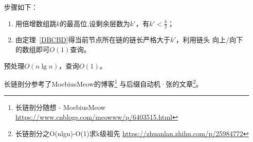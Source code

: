 步骤如下：
\begin{enumerate}
    \item 用倍增数组跳$k$的最高位,设剩余层数为$k'$，有$k'<\frac{k}{2}$；
    \item 由定理~\ref{DBCBD}得当前节点所在链的链长严格大于$k'$，利用链头
    向上/向下的数组即可$O(1)$查询。
\end{enumerate}

预处理$O(n\lg n)$，查询$O(1)$。

长链剖分参考了MoebiusMeow的博客\footnote{长链剖分随想 - MoebiusMeow
    \url{https://www.cnblogs.com/meowww/p/6403515.html}
}
与后缀自动机·张的文章\footnote{长链剖分之O(nlgn)-O(1)求k级祖先
    \url{https://zhuanlan.zhihu.com/p/25984772}
}。
